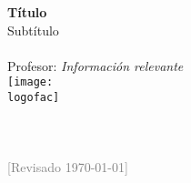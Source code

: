

\begin{titlepage}
    \begin{center}
        \vspace*{0pt}   
        \Huge
        \textbf{Título}\\
        \vspace{1ex}
        \Large
        Subtítulo \\
        \vspace{5ex}
        \textbf{\autorUNO}\\
        \vspace{.5ex}
        Profesor: \profesorUNO
        \vfill
        \large\textit{Información relevante}\\
        \vspace{3ex}
        \texttt{[image: \\logofac]}\\
        \vspace{2ex}
        \large
        \textsc{\carrera}\\
        \textsc{\universidad}\\
        \vspace{.5ex}
        \normalsize \fecha\\
        \footnotesize \textcolor{gray}{[Revisado \today ]}
    \end{center}
\end{titlepage}